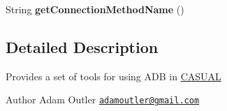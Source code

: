 \begin{DoxyCompactItemize}
\item 
\hypertarget{class_c_a_s_u_a_l_1_1communicationstools_1_1adb_1_1_a_d_b_tools_a2db7508e0a471d6dfb6f0379c840ca19}{String {\bfseries get\-Connection\-Method\-Name} ()}\label{class_c_a_s_u_a_l_1_1communicationstools_1_1adb_1_1_a_d_b_tools_a2db7508e0a471d6dfb6f0379c840ca19}

\end{DoxyCompactItemize}


\subsection{Detailed Description}
Provides a set of tools for using A\-D\-B in \hyperlink{namespace_c_a_s_u_a_l}{C\-A\-S\-U\-A\-L}

\begin{DoxyAuthor}{Author}
Adam Outler \href{mailto:adamoutler@gmail.com}{\tt adamoutler@gmail.\-com} 
\end{DoxyAuthor}


